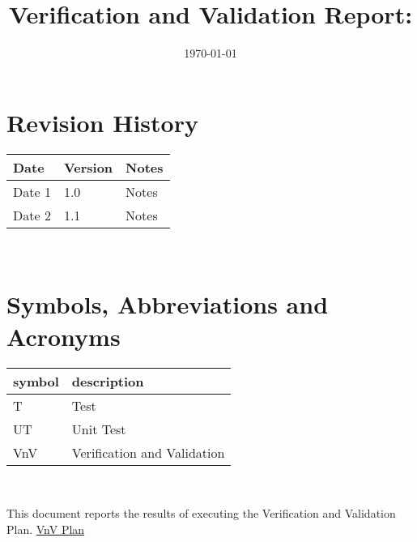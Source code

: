 \documentclass[12pt, titlepage]{article}
\begin{document}
\title{Verification and Validation Report: \progname{}} 
\author{\authname}
\date{\today}
	
\maketitle


\section{Revision History}

\begin{tabularx}{\textwidth}{p{3cm}p{2cm}X}
\toprule {\bf Date} & {\bf Version} & {\bf Notes}\\
\midrule
Date 1 & 1.0 & Notes\\
Date 2 & 1.1 & Notes\\
\bottomrule
\end{tabularx}

~\newpage

\section{Symbols, Abbreviations and Acronyms}

\renewcommand{\arraystretch}{1.2}
\begin{tabular}{l l} 
  \toprule		
  \textbf{symbol} & \textbf{description}\\
  \midrule 
  T & Test\\
  UT & Unit Test \\
  VnV & Verification and Validation \\
  \bottomrule
\end{tabular}\\


\newpage

\tableofcontents

\listoftables %

\listoffigures %

\newpage


This document reports the results of executing the Verification and Validation Plan. \href{https://github.com/AhmedAl-Hayali/GenreGuru/blob/main/docs/VnVPlan/VnVPlan.pdf}{VnV Plan}
\end{document}
